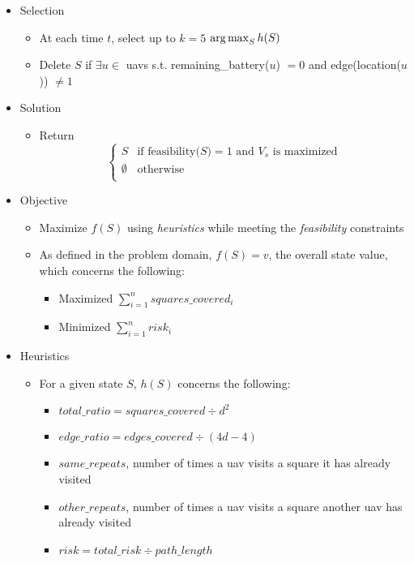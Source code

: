 \documentclass[../main.tex]{subfiles}
\begin{document}
\begin{itemize}
    \item Selection
    \begin{itemize}
        \item At each time $t$, select up to $k=5$ $\operatorname*{arg\,max}_S h(S)$
        \item Delete $S$ if $\exists u\in$ \acp{uav} s.t. remaining\_battery($u$) $=0$ and edge(location($u$)) $\neq 1$
    \end{itemize}

    \pagebreak
    
    \item Solution
    \begin{itemize}
        \item Return \[
            \begin{cases}
                S & \text{if feasibility(}S\text{)}=1 \text{ and }V_s\text{ is maximized} \\
                \emptyset & \text{otherwise} \\
            \end{cases}
        \]
    \end{itemize}

    \item Objective
    \begin{itemize}
        \item Maximize $f(S)$ using \textit{heuristics} while meeting the \textit{feasibility} constraints
        \item As defined in the problem domain, $f(S)=v$, the overall state value, which concerns the following: 
        \begin{itemize}
            \item Maximized $\sum_{i=1}^{n}{squares\_covered_i}$
            \item Minimized $\sum_{i=1}^{n}{risk_i}$
        \end{itemize}
    \end{itemize}

    \item Heuristics
    \begin{itemize}
        \item For a given state $S$, $h(S)$ concerns the following:
        \begin{itemize}
            \item $total\_ratio=squares\_covered\div d^2$
            \item $edge\_ratio=edges\_covered\div (4d-4)$
            \item $same\_repeats$, number of times a \ac{uav} visits a square it has already visited
            \item $other\_repeats$, number of times a \ac{uav} visits a square another \ac{uav} has already visited
            \item $risk=total\_risk\div path\_length$
        \end{itemize}
    \end{itemize}
\end{itemize}
\end{document}
